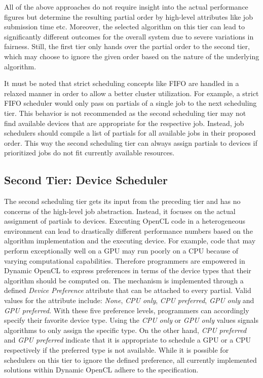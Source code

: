 All of the above approaches do not require insight into the actual performance figures but determine the resulting partial order by high-level attributes like job submission time etc. Moreover, the selected algorithm on this tier can lead to significantly different outcomes for the overall system due to severe variations in fairness. Still, the first tier only hands over the partial order to the second tier, which may choose to ignore the given order based on the nature of the underlying algorithm.

It must be noted that strict scheduling concepts like FIFO are handled in a relaxed manner in order to allow a better cluster utilization. For example, a strict FIFO scheduler would only pass on partials of a single job to the next scheduling tier. This behavior is not recommended as the second scheduling tier may not find available devices that are appropriate for the respective job. Instead, job schedulers should compile a list of partials for all available jobs in their proposed order. This way the second scheduling tier can always assign partials to devices if prioritized jobs do not fit currently available resources.

\subsection{Second Tier: Device Scheduler}
The second scheduling tier gets its input from the preceding tier and has no concerns of the high-level job abstraction. Instead, it focuses on the actual assignment of partials to devices. Executing OpenCL code in a heterogeneous environment can lead to drastically different performance numbers based on the algorithm implementation and the executing device. For example, code that may perform exceptionally well on a GPU may run poorly on a CPU because of varying computational capabilities. Therefore programmers are empowered in Dynamic OpenCL to express preferences in terms of the device types that their algorithm should be computed on. The mechanism is implemented through a defined \textit{Device Preference} attribute that can be attached to every partial. Valid values for the attribute include: \textit{None}, \textit{CPU only}, \textit{CPU preferred}, \textit{GPU only} and \textit{GPU preferred}. With these five preference levels, programmers can accordingly specify their favorite device type. Using the \textit{CPU only} or \textit{GPU only} values signals algorithms to only assign the specific type. On the other hand, \textit{CPU preferred} and \textit{GPU preferred} indicate that it is appropriate to schedule a GPU or a CPU respectively if the preferred type is not available. While it is possible for schedulers on this tier to ignore the defined preference, all currently implemented solutions within Dynamic OpenCL adhere to the specification.

